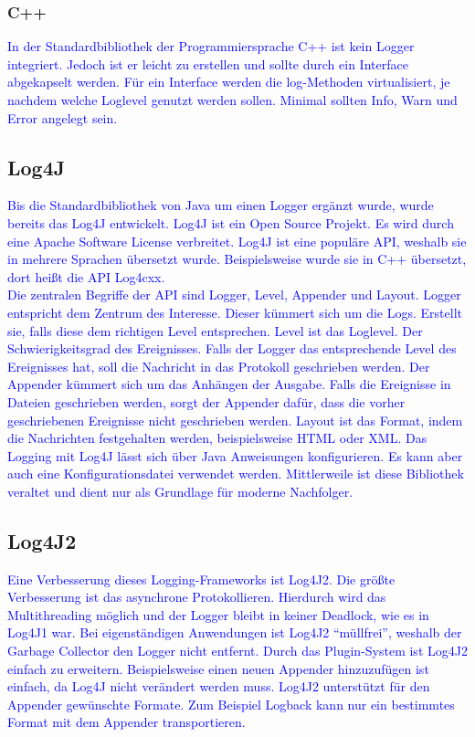 \subsubsection{C++}\label{subsubsec:c++}
\textcolor{blue}{
    In der Standardbibliothek der Programmiersprache C++ ist kein Logger integriert.
    Jedoch ist er leicht zu erstellen und sollte durch ein Interface abgekapselt werden.
    Für ein Interface werden die log-Methoden virtualisiert, je nachdem welche Loglevel genutzt werden sollen.
    Minimal sollten Info, Warn und Error angelegt sein.
}\autocite{c++}

\subsection{Log4J}\label{subsec:log4j}
\textcolor{blue}{
    Bis die Standardbibliothek von Java um einen Logger ergänzt wurde, wurde bereits das Log4J entwickelt.
    Log4J ist ein Open Source Projekt.
    Es wird durch eine Apache Software License verbreitet.
    Log4J ist eine populäre API, weshalb sie in mehrere Sprachen übersetzt wurde.
    Beispielsweise wurde sie in C++ übersetzt, dort heißt die API Log4cxx.
    \\
    Die zentralen Begriffe der API sind Logger, Level, Appender und Layout.
    Logger entspricht dem Zentrum des Interesse.
    Dieser kümmert sich um die Logs.
    Erstellt sie, falls diese dem richtigen Level entsprechen.
    Level ist das Loglevel.
    Der Schwierigkeitsgrad des Ereignisses.
    Falls der Logger das entsprechende Level des Ereignisses hat, soll die Nachricht in das Protokoll geschrieben werden.
    Der Appender kümmert sich um das Anhängen der Ausgabe.
    Falls die Ereignisse in Dateien geschrieben werden, sorgt der Appender dafür, dass die vorher geschriebenen Ereignisse nicht geschrieben werden.
    Layout ist das Format, indem die Nachrichten festgehalten werden, beispielsweise HTML oder XML.
    Das Logging mit Log4J lässt sich über Java Anweisungen konfigurieren.
    Es kann aber auch eine Konfigurationsdatei verwendet werden.
    Mittlerweile ist diese Bibliothek veraltet und dient nur als Grundlage für moderne Nachfolger.}

\subsection{Log4J2}\label{subsec:log4j2}
\textcolor{blue}{
    Eine Verbesserung dieses Logging-Frameworks ist Log4J2.
    Die größte Verbesserung ist das asynchrone Protokollieren.
    Hierdurch wird das Multithreading möglich und der Logger bleibt in keiner Deadlock, wie es in Log4J1 war.
    Bei eigenständigen Anwendungen ist Log4J2 \enquote{müllfrei}, weshalb der Garbage Collector den Logger nicht entfernt.
    Durch das Plugin-System ist Log4J2 einfach zu erweitern.
    Beispielsweise einen neuen Appender hinzuzufügen ist einfach, da Log4J nicht verändert werden muss.
    Log4J2 unterstützt für den Appender gewünschte Formate.
    Zum Beispiel Logback kann nur ein bestimmtes Format mit dem Appender transportieren.
}


